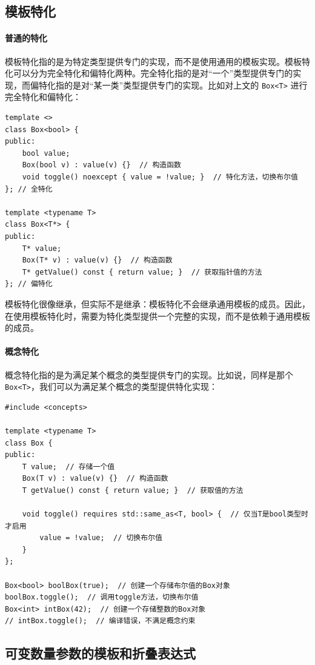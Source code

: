 \subsection{模板特化}

\paragraph{普通的特化}

模板特化指的是为特定类型提供专门的实现，而不是使用通用的模板实现。模板特化可以分为完全特化和偏特化两种。完全特化指的是对“一个”类型提供专门的实现，而偏特化指的是对“某一类”类型提供专门的实现。比如对上文的 \verb|Box<T>| 进行完全特化和偏特化：
\begin{verbatim}
template <>
class Box<bool> {
public:
    bool value;
    Box(bool v) : value(v) {}  // 构造函数
    void toggle() noexcept { value = !value; }  // 特化方法，切换布尔值
}; // 全特化

template <typename T>
class Box<T*> {
public:
    T* value;
    Box(T* v) : value(v) {}  // 构造函数
    T* getValue() const { return value; }  // 获取指针值的方法
}; // 偏特化
\end{verbatim}

模板特化很像继承，但实际不是继承：模板特化不会继承通用模板的成员。因此，在使用模板特化时，需要为特化类型提供一个完整的实现，而不是依赖于通用模板的成员。

\paragraph{概念特化}

概念特化指的是为满足某个概念的类型提供专门的实现。比如说，同样是那个\verb|Box<T>|，我们可以为满足某个概念的类型提供特化实现：
\begin{verbatim}
#include <concepts>

template <typename T>
class Box {
public:
    T value;  // 存储一个值
    Box(T v) : value(v) {}  // 构造函数
    T getValue() const { return value; }  // 获取值的方法

    void toggle() requires std::same_as<T, bool> {  // 仅当T是bool类型时才启用
        value = !value;  // 切换布尔值
    }
};

Box<bool> boolBox(true);  // 创建一个存储布尔值的Box对象
boolBox.toggle();  // 调用toggle方法，切换布尔值
Box<int> intBox(42);  // 创建一个存储整数的Box对象
// intBox.toggle();  // 编译错误，不满足概念约束
\end{verbatim}

\subsection{可变数量参数的模板和折叠表达式}\label{sec:foldexpr}

